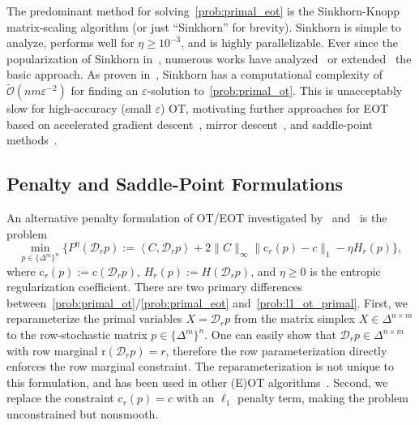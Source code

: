 \documentclass[10pt]{article}
\renewcommand{\O}{\mathcal{O}}
\newcommand{\tO}{\widetilde{\O}}
\newcommand{\softmax}{\operatorname{smax}}
\newcommand{\inner}[2]{\left\langle #1,#2\right\rangle}
\newcommand{\diag}[1]{\mathcal{D}_{#1}}
\theoremstyle{plain}
\theoremstyle{definition}
\theoremstyle{remark}
\newcommand{\col}{\bm{\mathrm{c}}}
\newcommand{\row}{\bm{\mathrm{r}}}
\begin{document}
The predominant method for solving~\eqref{prob:primal_eot} is the Sinkhorn-Knopp matrix-scaling algorithm (or just ``Sinkhorn'' for brevity). Sinkhorn is simple to analyze, performs well for $\eta \geq 10^{-3}$, and is highly parallelizable. Ever since the popularization of Sinkhorn in~\cite{cuturiSinkhornDistancesLightspeed2013}, numerous works have analyzed~\cite{altschulerNearlinearTimeApproximation2017,dvurechenskyComputationalOptimalTransport2018,ghosalConvergenceRateSinkhorns2025c} or extended~\cite{benamouIterativeBregmanProjections2015,linEfficiencyEntropicRegularized2022} the basic approach. As proven in~\cite{dvurechenskyComputationalOptimalTransport2018}, Sinkhorn has a computational complexity of $\tO(nm\varepsilon^{-2})$ for finding an $\varepsilon$-solution to~\eqref{prob:primal_ot}. This is unacceptably slow for high-accuracy (small $\varepsilon$) OT, motivating further approaches for EOT based on accelerated gradient descent~\cite{dvurechenskyComputationalOptimalTransport2018}, mirror descent~\cite{linEfficiencyEntropicRegularized2022}, and saddle-point methods~\cite{jambulapatiDirectTildelbraceOrbrace2019a,chambolleAcceleratedBregmanPrimalDual2022}. 



\subsection{Penalty and Saddle-Point Formulations}\label{subsec:saddle}
An alternative penalty formulation of OT/EOT investigated by~\cite{jambulapatiDirectTildelbraceOrbrace2019a} and~\cite{liFastComputationOptimal2025} is the problem
\begin{equation}
    \min_{p\in\{\Delta^m\}^n}\{P^{\eta }(\diag{r}p)
    :=\inner{C}{\diag{r}p}+2\|C\|_\infty\|\col_r(p)-c\|_1-\eta  H_r(p)\},\label{prob:l1_ot_primal}
\end{equation}
where $\col_r(p):=\col(\diag{r}p)$, $H_r(p):=H(\diag{r}p)$, and $\eta \geq 0$ is the entropic regularization coefficient. 
There are two primary differences between~\eqref{prob:primal_ot}/\eqref{prob:primal_eot} and~\eqref{prob:l1_ot_primal}. First, we reparameterize the primal variables $X=\diag{r}p$ from the matrix simplex $X\in \Delta^{n\times m}$ to the row-stochastic matrix $p\in\{\Delta^{m}\}^n$. One can easily show that $\diag{r}p\in \Delta^{n\times m}$ with row marginal $\row(\diag{r}p)=r$, therefore the row parameterization directly enforces the row marginal constraint. The reparameterization is not unique to this formulation, and has been used in other (E)OT algorithms~\cite{chambolleAcceleratedBregmanPrimalDual2022}. Second, we replace the constraint $\col_r(p)=c$ with an $\ell_1$ penalty term, making the problem unconstrained but nonsmooth. 
\end{document}
